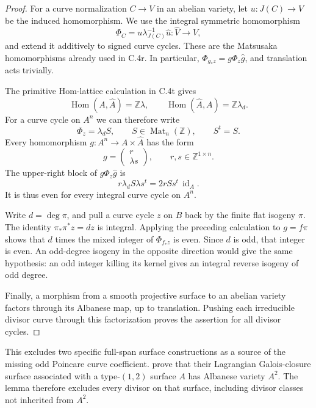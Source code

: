\begin{proof}
For a curve normalization $C\to V$ in an abelian variety, let
$u:J(C)\to V$ be the induced homomorphism. We use the integral
symmetric homomorphism
\[
             \Phi_C=u\lambda_{J(C)}^{-1}\widehat u
                         :\widehat V\longrightarrow V,
\]
and extend it additively to signed curve cycles. These are the
Matsusaka homomorphisms already used in C.4r. In particular,
$\Phi_{g_*z}=g\Phi_z\widehat g$, and translation acts trivially.

The primitive Hom-lattice calculation in C.4t gives
\[
 \operatorname{Hom}(A,\widehat A)=\mathbb Z\lambda,
 \qquad
 \operatorname{Hom}(\widehat A,A)=\mathbb Z\lambda_d.
\]
For a curve cycle on $A^n$ we can therefore write
\[
                         \Phi_z=\lambda_d S,
             \qquad S\in\operatorname{Mat}_n(\mathbb Z),
             \qquad S^t=S.
\]
Every homomorphism $g:A^n\to A\times\widehat A$ has the form
\[
                  g=\begin{pmatrix}r\\ \lambda s\end{pmatrix},
                     \qquad r,s\in\mathbb Z^{1\times n}.
\]
The upper-right block of $g\Phi_z\widehat g$ is
\[
               r\lambda_d S\lambda s^t
                       =2rSs^t\,\operatorname{id}_A.
\]
It is thus even for every integral curve cycle on $A^n$.

Write $d=\deg\pi$, and pull a curve cycle $z$ on $B$ back by
the finite flat isogeny $\pi$. The identity
$\pi_*\pi^*z=dz$ is integral. Applying the preceding calculation
to $g=f\pi$ shows that $d$ times the mixed integer of
$\Phi_{f_*z}$ is even. Since $d$ is odd, that integer is even.
An odd-degree isogeny in the opposite direction would give the
same hypothesis: an odd integer killing its kernel gives an
integral reverse isogeny of odd degree.

Finally, a morphism from a smooth projective surface to an
abelian variety factors through its Albanese map, up to
translation. Pushing each irreducible divisor curve through
this factorization proves the assertion for all divisor cycles.
\end{proof}

This excludes two specific full-span surface constructions as a
source of the missing odd Poincare curve coefficient.
\citet[Theorem 6.8, author pp.~25--26]{frC4BastianelliPirolaStoppino2010}
prove that their Lagrangian Galois-closure surface associated
with a type-$(1,2)$ surface $A$ has Albanese variety $A^2$.
The lemma therefore excludes every divisor on that surface,
including divisor classes not inherited from $A^2$.


